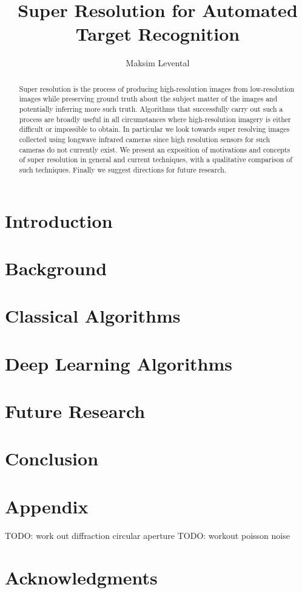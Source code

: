 \documentclass[journal]{IEEEtran}
\begin{document}
    \title{Super Resolution for Automated Target Recognition}
    \author{Maksim Levental}
    \maketitle

    \begin{abstract}
        Super resolution is the process of producing high-resolution images from low-resolution images while preserving ground truth about the subject matter of the images and potentially inferring more such truth.
        Algorithms that successfully carry out such a process are broadly useful in all circumstances where high-resolution imagery is either difficult or impossible to obtain.
        In particular we look towards super resolving images collected using longwave infrared cameras since high resolution sensors for such cameras do not currently exist.
        We present an exposition of motivations and concepts of super resolution in general and current techniques, with a qualitative comparison of such techniques.
        Finally we suggest directions for future research.
    \end{abstract}

    \section{Introduction}\label{sec:introduction}
%    
%
    \section{Background}\label{sec:background}
%    

    \section{Classical Algorithms}\label{sec:classical-algorithms}
    

    \section{Deep Learning Algorithms}\label{sec:deep-learning-algorithms}
    \section{Future Research}\label{sec:future-research}
    \section{Conclusion}\label{sec:conclusion}
    \section{Appendix}\label{sec:appendix}
    TODO: work out diffraction circular aperture
    TODO: workout poisson noise
    \section*{Acknowledgments}
    \newpage
    \printbibliography
\end{document}
